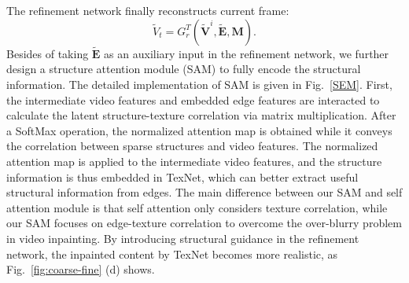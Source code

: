 {\color{blue}
	The refinement network finally reconstructs current frame:
	\begin{equation}
	\label{eq:refinenet}
	\widetilde{V}_t=G_{r}^T(\boldsymbol{\widetilde{V}}^i,\boldsymbol{\widetilde{E}},\boldsymbol{M}).	
	\end{equation}
}
Besides of taking $\boldsymbol{\widetilde{E}}$ as an auxiliary input in the refinement network, we further design a structure attention module (SAM) to fully encode the structural information.
The detailed implementation of SAM is given in Fig.~\ref{SEM}.
First, the intermediate video features and embedded edge features are interacted to calculate the latent structure-texture correlation via matrix multiplication. 
After a SoftMax operation, the normalized attention map is obtained while it conveys the correlation between sparse structures and video features.
%
The normalized attention map is applied to the intermediate video features, and the structure information is thus embedded in TexNet, which can better extract useful structural information from edges.
{\color{blue}
The main difference between our SAM and self attention module \cite{vaswani2017attention} is that self attention only considers texture correlation, while our SAM focuses on edge-texture correlation to overcome the over-blurry problem in video inpainting.}
By introducing structural guidance in the refinement network, the inpainted content by TexNet becomes more realistic, as Fig.~\ref{fig:coarse-fine} (d) shows.



